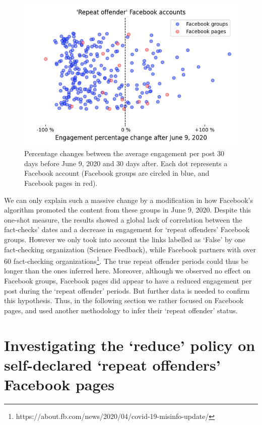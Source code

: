 \documentclass[11pt,a4paper]{article}
\begin{document}
\begin{figure}[!h]
\centering
\includegraphics[width=\linewidth]{./../figure/repeat_june_drop_percentage_change.png}
\caption{Percentage changes between the average engagement per post 30 days before June 9, 2020 and 30 days after. Each dot represents a Facebook account (Facebook groups are circled in blue, and Facebook pages in red).}
\label{repeat_june_drop_percentage_change}
\end{figure}

We can only explain such a massive change by a modification in how Facebook’s algorithm promoted the content from these groups in June 9, 2020.
Despite this one-shot measure, the results showed a global lack of correlation between the fact-checks' dates and a decrease in engagement for `repeat offenders' Facebook groups.
However we only took into account the links labelled as `False' by one fact-checking organization (Science Feedback), while Facebook partners with over 60 fact-checking organizations\footnote{https://about.fb.com/news/2020/04/covid-19-misinfo-update/}.
The true repeat offender periods could thus be longer than the ones inferred here.
Moreover, although we observed no effect on Facebook groups, Facebook pages did appear to have a reduced engagement per post during the `repeat offender' periods.
But further data is needed to confirm this hypothesis.
Thus, in the following section we rather focused on Facebook pages, and used another methodology to infer their `repeat offender' status.

\section{Investigating the `reduce’ policy on self-declared ‘repeat offenders’ Facebook pages}
\end{document}
